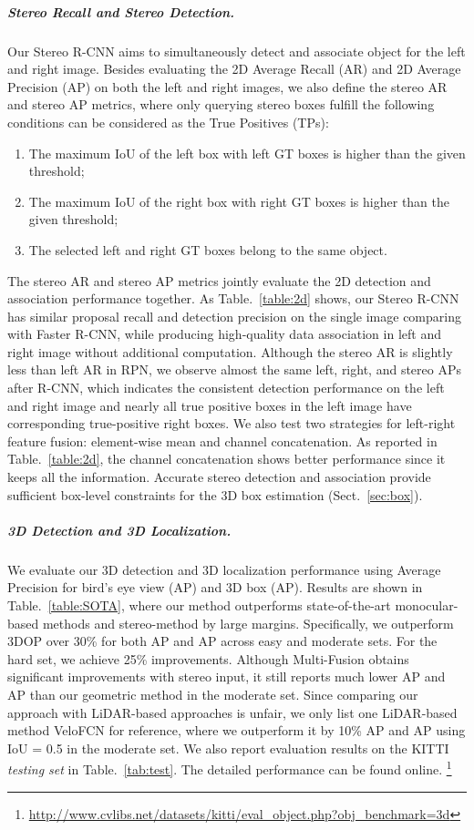 \documentclass[10pt,twocolumn,letterpaper]{article}
\begin{document}
	{\setlength{\parindent}{0cm}
		\subparagraph*{Stereo Recall and Stereo Detection.} Our Stereo R-CNN aims to simultaneously detect and associate object for the left and right image.
Besides evaluating the 2D Average Recall (AR) and 2D Average Precision (AP) on both the left and right images, we also define  the stereo AR and stereo AP metrics, where only querying stereo boxes fulfill the following conditions can be considered as the True Positives (TPs):
		\begin{enumerate}
			\itemsep0em
			\item The maximum IoU of the left box with left GT boxes is higher than the given threshold;
			\item The maximum IoU of the right box with right GT boxes is higher than the given threshold;
			\item The selected left and right GT boxes belong to the same object.
		\end{enumerate}
		The stereo AR and stereo AP metrics jointly evaluate the 2D detection and association performance together. As Table.~\ref{table:2d} shows, our Stereo R-CNN has similar proposal recall and detection precision on the single image comparing with Faster R-CNN, while producing high-quality data association in left and right image without additional computation. Although the stereo AR is slightly less than left AR in RPN, we observe almost the same left, right, and stereo APs after R-CNN, which indicates the consistent detection performance on the left and right image and nearly all true positive boxes in the left image have corresponding true-positive right boxes. We also test two strategies for left-right feature fusion: element-wise mean and channel concatenation. As reported in Table.~\ref{table:2d}, the channel concatenation shows better performance since it keeps all the information.
		Accurate stereo detection and association provide sufficient box-level constraints for the 3D box estimation (Sect.~\ref{sec:box}).
	}
\vspace{-0.1cm}
	{\setlength{\parindent}{0cm}
		\subparagraph*{3D Detection and 3D Localization.} We evaluate our 3D detection and 3D localization performance using Average Precision for bird's eye view (AP) and 3D box (AP). Results are shown in Table.~\ref{table:SOTA}, where our method outperforms state-of-the-art monocular-based methods \cite{chen2016monocular,mousavian20173d,cvpr18xu} and stereo-method \cite{3dopJournal} by large margins. Specifically, we outperform 3DOP \cite{3dopJournal} over 30\% for both AP and AP across easy and moderate sets. For the hard set, we achieve 25\% improvements. Although Multi-Fusion \cite{cvpr18xu} obtains significant improvements with stereo input, it still reports much lower AP and AP than our geometric method in the moderate set.
Since comparing our approach with LiDAR-based approaches is unfair, we only list one LiDAR-based method VeloFCN \cite{li2016vehicle} for reference, where we outperform it by 10\% AP and AP using IoU = 0.5 in the moderate set.
We also report evaluation results on the KITTI \textit{testing set} in Table.~\ref{tab:test}. The detailed performance can be found online. \footnote{\url{http://www.cvlibs.net/datasets/kitti/eval_object.php?obj_benchmark=3d}}
	}
\end{document}
